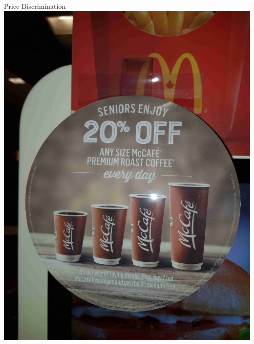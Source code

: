 \documentclass{beamer}
\begin{document}
\begin{frame}{Price Discrimination}
\centering
\includegraphics[width = .8\textwidth, height = .8\textheight]{images/seniorcoffee.jpg}
\end{frame}
\end{document}
